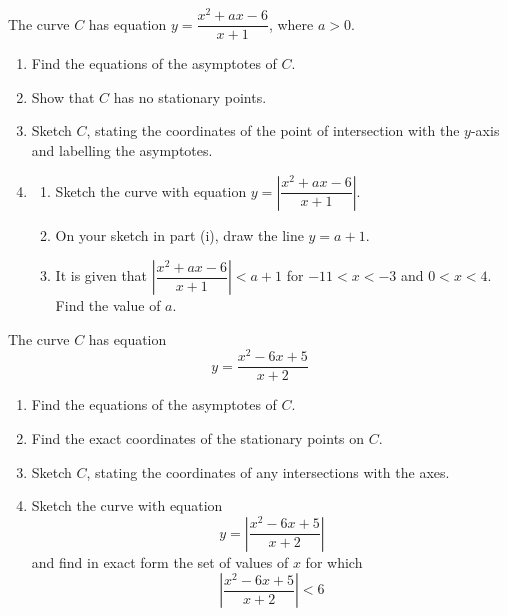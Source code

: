 \documentclass[leqno]{article}
\begin{document}
\begin{enumerate}[
  label=\textbf{\arabic*.},
  leftmargin=*,
  topsep=0pt,
  partopsep=0pt,
  parsep=0pt
]
\newpage

\questionitem

The curve $C$ has equation $y = \dfrac{x^2 + ax - 6}{x + 1}$, where $a > 0$. \\
\begin{enumerate}[label=\textbf{(\alph*)}]
  \item Find the equations of the asymptotes of $C$.  \\
  \item Show that $C$ has no stationary points.  \\
  \item Sketch $C$, stating the coordinates of the point of intersection with the $y$-axis and labelling the asymptotes.  \\
  \item
  \begin{enumerate}[label=(\roman*)]
    \item Sketch the curve with equation $y = \left|\dfrac{x^2 + ax - 6}{x + 1}\right|$. 
    \item On your sketch in part (i), draw the line $y = a + 1$. 
    \item It is given that $\left|\dfrac{x^2 + ax - 6}{x + 1}\right| < a + 1$ for $-11 < x < -3$ and $0 < x < 4$. \\
    Find the value of $a$. 
  \end{enumerate}
\end{enumerate}


\newpage

\questionitem

The curve $C$ has equation
\[
y=\frac{x^2-6x+5}{x+2}
\]
\begin{enumerate}[label=\textbf{(\alph*)}]
  \item Find the equations of the asymptotes of $C$.  \\
  \item Find the exact coordinates of the stationary points on $C$.  \\
  \item Sketch $C$, stating the coordinates of any intersections with the axes.  \\
  \item Sketch the curve with equation
  \[
  y=\left|\frac{x^2-6x+5}{x+2}\right|
  \]
  and find in exact form the set of values of $x$ for which
  \[
  \left|\frac{x^2-6x+5}{x+2}\right|<6
  \]
\end{enumerate}


\end{enumerate}
\end{document}
